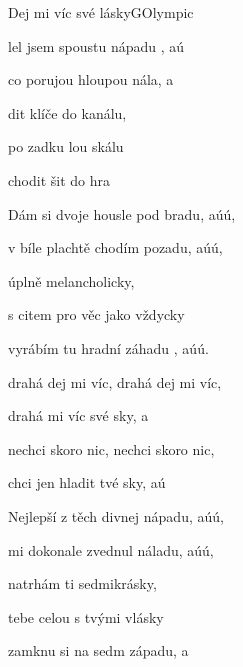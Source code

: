\begin{song}{Dej mi víc své lásky}{G}{Olympic}

\begin{SBVerse}

lel jsem spoustu nápadu , aú

co porujou hloupou nála, a

dit klíče do kanálu,

 po zadku lou skálu

 chodit šit do hra

\end{SBVerse}

\begin{SBVerse}

Dám si dvoje housle pod bradu, aúú,

v bíle plachtě chodím pozadu, aúú,

úplně melancholicky,

s citem pro věc jako vždycky

vyrábím tu hradní záhadu , aúú.

\end{SBVerse}

\begin{SBChorus}

 drahá dej mi víc,  drahá dej mi víc,

 drahá  mi víc své sky, a

 nechci skoro nic, nechci skoro nic,

 chci jen hladit tvé sky, aú

\end{SBChorus}

\begin{SBVerse}

Nejlepší z těch divnej nápadu, aúú,

mi dokonale zvednul náladu, aúú,

natrhám ti sedmikrásky,

tebe celou s tvými vlásky

zamknu si na sedm západu, a

\end{SBVerse}

\begin{SBChorus}

\end{SBChorus}

\end{song}

\clearpage

